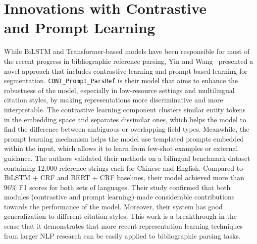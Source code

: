 \section[Innovations with Contrastive and Prompt Learning]{Innovations with Contrastive\\ and Prompt Learning}
While BiLSTM and Transformer-based models have been responsible for most of the recent progress in bibliographic reference parsing, Yin and Wang~\cite{contrastive} presented a novel approach that includes contrastive learning and prompt-based learning for segmentation.
\texttt{CONT\_Prompt\_ParsRef} is their model that aims to enhance the robustness of the model, especially in low-resource settings and multilingual citation styles, by making representations more discriminative and more interpretable. The contrastive learning component clusters similar entity tokens in the embedding space and separates dissimilar ones, which helps the model to find the difference between ambiguous or overlapping field types. Meanwhile, the prompt learning mechanism helps the model use templated prompts embedded within the input, which allows it to learn from few-shot examples or external guidance.
The authors validated their methods on a bilingual benchmark dataset containing 12,000 reference strings each for Chinese and English. Compared to BiLSTM + CRF and BERT + CRF baselines, their model achieved more than 96\% F1 scores for both sets of languages. Their study confirmed that both modules (contrastive and prompt learning) made considerable contributions towards the performance of the model. Moreover, their system has good generalization to different citation styles. This work is a breakthrough in the sense that it demonstrates that more recent representation learning techniques from larger NLP research can be easily applied to bibliographic parsing tasks.


